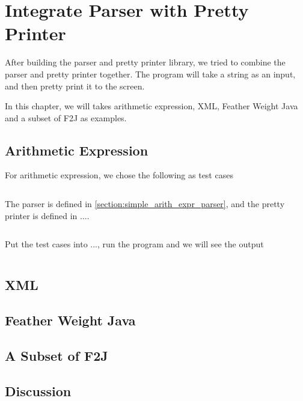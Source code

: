 \chapter{Integrate Parser with Pretty Printer}

After building the parser and pretty printer library, we tried to combine the parser and pretty printer together. The program will take a string as an input, and then pretty print it to the screen.

In this chapter, we will takes arithmetic expression, XML, Feather Weight Java and a subset of F2J as examples.

\section{Arithmetic Expression}

For arithmetic expression, we chose the following as test cases

\begin{lstlisting}

\end{lstlisting}

The parser is defined in \ref{section:simple_arith_expr_parser}, and the pretty printer is defined in ....

\begin{lstlisting}

\end{lstlisting}

Put the test cases into ..., run the program and we will see the output

\begin{lstlisting}

\end{lstlisting}

\section{XML}

\section{Feather Weight Java}

\section{A Subset of F2J}

\section{Discussion}
